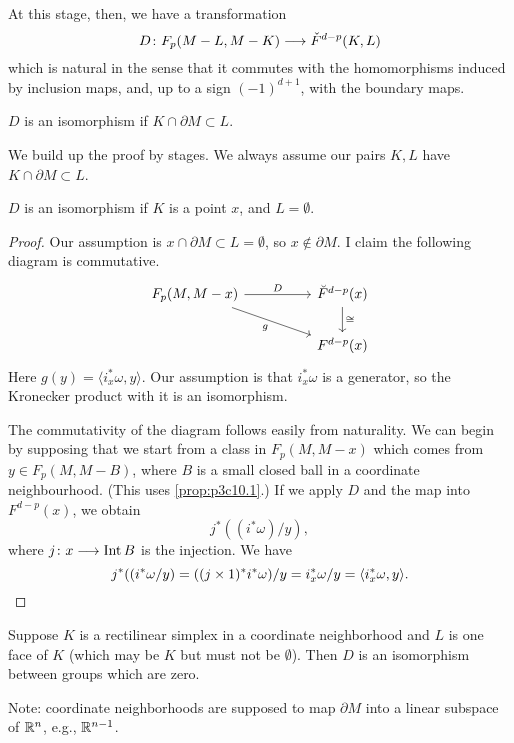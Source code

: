 \documentclass[../main]{subfiles}
\begin{document}
At this stage, then, we have a transformation
\[D \colon F_p(M-L,M-K) \longrightarrow \check{F}^{d-p}(K,L)\]
which is natural in the sense that it commutes with the homomorphisms induced by inclusion maps, and, up to a sign $(-1)^{d+1}$, with the boundary maps.
\begin{theorem}\label{thm:p3c10.6}
$D$ is an isomorphism if $K \cap \partial M \subset L$.
\end{theorem}
We build up the proof by stages. We always assume our pairs $K,L$ have $K \cap \partial M \subset L$.
\begin{remark}\label{rmk:p3c10.7}
$D$ is an isomorphism if $K$ is a point $x$, and $L = \emptyset$.
\end{remark}
\begin{proof}
Our assumption is $x \cap \partial M \subset L = \emptyset$, so $x \not\in \partial M$. I claim the following diagram is commutative.
\[
\begin{tikzcd}
{F_p(M, M - x)} \arrow[rrd, "g"'] \arrow[rr, "D"] &  & \breve F^{d - p}(x) \arrow[d, "\cong"] \\
                                                  &  & F^{d - p}(x)                          
\end{tikzcd}
\]
Here $g(y) = \langle i_x^* \omega, y \rangle$. Our assumption is that $i_x^* \omega$ is a generator, so the Kronecker product with it is an isomorphism.

The commutativity of the diagram follows easily from naturality. We can begin by supposing that we start from a class in $F_p(M,M-x)$ which comes from $y \in F_p(M,M-B)$, where $B$ is a small closed ball in a coordinate neighbourhood. (This uses \ref{prop:p3c10.1}.) If we apply $D$ and the map into $F^{d-p}(x)$, we obtain
\[j^*((i^* \omega)/y),\]
where $j \colon x \longrightarrow \operatorname{Int} B$ is the injection. We have
\[
	j^*((i^*\omega/y) = ((j \times 1)^* i^* \omega)/y = i_x^*\omega/y = \langle i_x^* \omega, y \rangle. \qedhere
\]
\end{proof}
\begin{remark}\label{rmk:p3c10.8}
Suppose $K$ is a rectilinear simplex in a coordinate neighborhood and $L$ is one face of $K$ (which may be $K$ but must not be $\emptyset$). Then $D$ is an isomorphism between groups which are zero.
\end{remark}
Note: coordinate neighborhoods are supposed to map $\partial M$ into a linear subspace of $\mathbb{R}^n$, e.g., $\mathbb{R}^{n-1}$.
\end{document}
